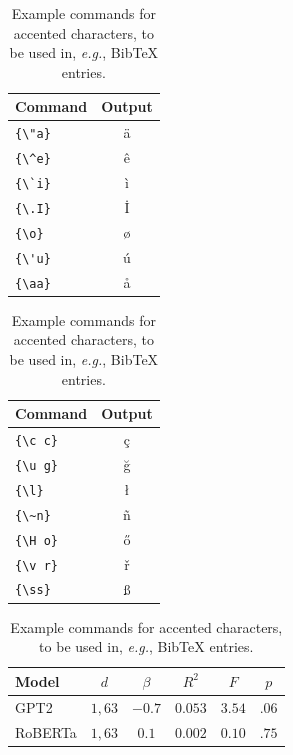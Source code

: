\documentclass[11pt]{article}
\begin{document}
\begin{table}
    \centering
    \begin{tabular}{lc}
        \hline
        \textbf{Command} & \textbf{Output} \\
        \hline
        \verb|{\"a}|     & {\"a}           \\
        \verb|{\^e}|     & {\^e}           \\
        \verb|{\`i}|     & {\`i}           \\
        \verb|{\.I}|     & {\.I}           \\
        \verb|{\o}|      & {\o}            \\
        \verb|{\'u}|     & {\'u}           \\
        \verb|{\aa}|     & {\aa}           \\\hline
    \end{tabular}
    \begin{tabular}{lc}
        \hline
        \textbf{Command} & \textbf{Output} \\
        \hline
        \verb|{\c c}|    & {\c c}          \\
        \verb|{\u g}|    & {\u g}          \\
        \verb|{\l}|      & {\l}            \\
        \verb|{\~n}|     & {\~n}           \\
        \verb|{\H o}|    & {\H o}          \\
        \verb|{\v r}|    & {\v r}          \\
        \verb|{\ss}|     & {\ss}           \\
        \hline
    \end{tabular}
    \caption{Example commands for accented characters, to be used in, \emph{e.g.}, Bib\TeX{} entries.}
    \label{tab:accents}

\end{table}

\begin{table}
    \centering
    \begin{tabular}{lccccc}
        \hline
        \textbf{Model} & \textbf{$d$} & \textbf{$\beta$} & \textbf{$R^2$} & \textbf{$F$} & \textbf{$p$} \\
        \hline
        GPT2           & $1, 63$      & $-0.7$           & $0.053$        & $3.54$       & $.06$        \\
        RoBERTa        & $1, 63$      & $0.1$            & $0.002$        & $0.10$       & $.75$        \\
        \hline
    \end{tabular}

    \caption{Example commands for accented characters, to be used in, \emph{e.g.}, Bib\TeX{} entries.}
    \label{tab:accents}
\end{table}
\end{document}

